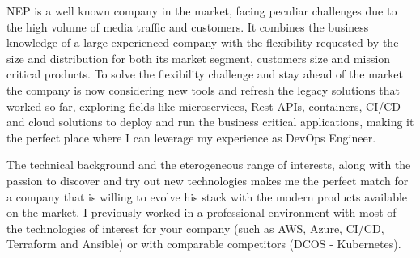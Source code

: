 \documentclass[11pt, a4paper]{awesome-cv}
\begin{document}
\begin{cvletter}
NEP is a well known company in the market, facing peculiar challenges due to the high volume of media traffic and customers. It combines the business knowledge of a large experienced company with the flexibility requested by the size and distribution for both its market segment, customers size and mission critical products. To solve the flexibility challenge and stay ahead of the market the company is now considering new tools and refresh the legacy solutions that worked so far, exploring fields like microservices, Rest APIs, containers, CI/CD and cloud solutions to deploy and run the business critical applications, making it the perfect place where I can leverage my experience as DevOps Engineer.


The technical background and the eterogeneous range of interests, along with the passion to discover and try out new technologies makes me the perfect match for a company that is willing to evolve his stack with the modern products available on the market. I previously worked in a professional environment with most of the technologies of interest for your company (such as AWS, Azure, CI/CD, Terraform and Ansible) or with comparable competitors (DCOS - Kubernetes).

\end{cvletter}


\makeletterclosing
\end{document}

